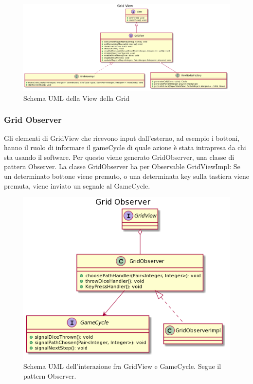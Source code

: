 \documentclass[a4paper,12pt]{report}
\begin{document}
	\begin{figure}[h]
		\centering{}
		\includegraphics[width=\textwidth]{images/miriana/grid_view.png}
		\caption{Schema UML della View della Grid}
		\label{img:gridview}
	\end{figure}

    \subsubsection {Grid Observer}
	Gli elementi di GridView che ricevono input dall’esterno, ad esempio i bottoni, hanno il ruolo di informare il gameCycle di quale azione è stata intrapresa da chi sta usando il software.
	Per questo viene generato GridObserver, una classe di pattern Observer.
	La classe GridObserver ha per Observable GridViewImpl: Se un determinato bottone viene premuto, o una determinata key sulla tastiera viene premuta, viene inviato un segnale al GameCycle.

	\begin{figure}[h]
	\centering{}
	\includegraphics[width=\textwidth]{images/miriana/grid_observer.png}
	\caption{Schema UML dell'interazione fra GridView e GameCycle. Segue il pattern Observer.}
	\label{img:gridobserver}
	\end{figure}
\end{document}

